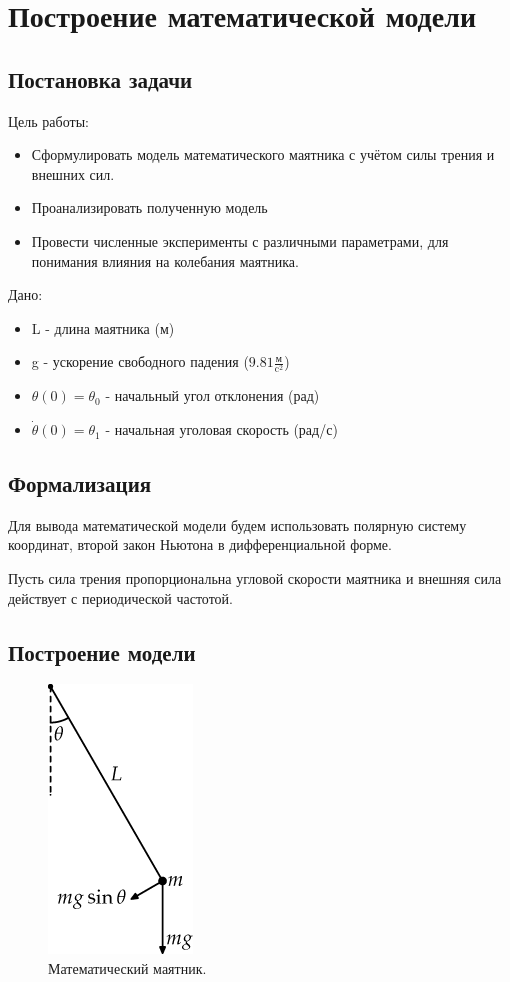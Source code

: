 \chapter{Построение математической модели}
\section{Постановка задачи}
Цель работы:
\begin{itemize}
	\item Сформулировать модель математического маятника с учётом силы трения и внешних сил.
	\item Проанализировать полученную модель
	\item Провести численные эксперименты с различными параметрами, для понимания влияния на колебания маятника.
\end{itemize}

Дано:
\begin{itemize}
	\item L - длина маятника (м)
	\item g - ускорение свободного падения ($9.81 \frac{\text{м}}{\text{c}^2}$)
	\item $\theta(0) = \theta_0$ - начальный угол отклонения (рад)
	\item $\dot{\theta}(0) = \theta_1$ - начальная уголовая скорость (рад/с)
\end{itemize}
\section{Формализация}
Для вывода математической модели будем использовать полярную систему координат, второй закон Ньютона в дифференциальной форме.

Пусть сила трения пропорциональна угловой скорости маятника и внешняя сила 
действует с периодической частотой.

\section{Построение модели}
\begin{figure}[h]  %
	\centering
	\includegraphics[height=0.3\textwidth]{imgs/pendulum_model.png}  %
	\caption{Математический маятник.}  %
	\label{fig:pendulum}  %
\end{figure}

